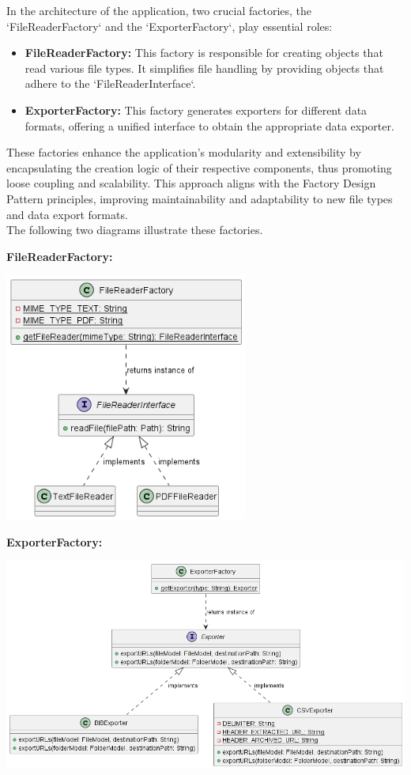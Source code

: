 In the architecture of the application, two crucial factories, the `FileReaderFactory` and the `ExporterFactory`, play essential roles:

\begin{itemize}
    \item \textbf{FileReaderFactory:} This factory is responsible for creating objects that read various file types. It simplifies file handling by providing objects that adhere to the `FileReaderInterface`.
    \item \textbf{ExporterFactory:} This factory generates exporters for different data formats, offering a unified interface to obtain the appropriate data exporter.
\end{itemize}

These factories enhance the application's modularity and extensibility by encapsulating the creation logic of their respective components, thus promoting loose coupling and scalability. This approach aligns with the Factory Design Pattern principles, improving maintainability and adaptability to new file types and data export formats. \\

The following two diagrams illustrate these factories.
\clearpage

\textbf{FileReaderFactory:} \\
\vskip 0.5cm
\begin{center}
    \includegraphics[width=0.6\textwidth]{pictures/FileReaderFactory-0.png}
\end{center}
\vskip 1cm
\textbf{ExporterFactory:} \\
\vskip 0.5cm
\begin{center}
    \includegraphics[width=1\textwidth]{pictures/ExporterFactory-0.png}
\end{center}

